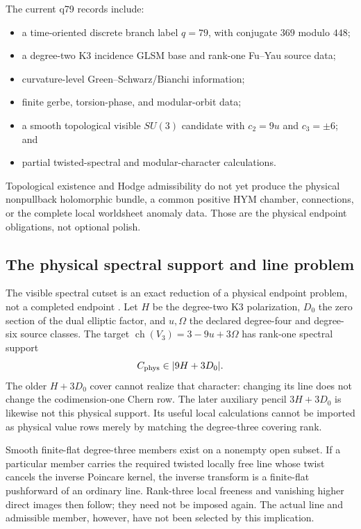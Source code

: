 \documentclass[11pt]{article}
\begin{document}
The current q79 records include:
\begin{itemize}
\item a time-oriented discrete branch label \(q=79\), with conjugate
\(369\) modulo \(448\);
\item a degree-two K3 incidence GLSM base and rank-one Fu--Yau source data;
\item curvature-level Green--Schwarz/Bianchi information;
\item finite gerbe, torsion-phase, and modular-orbit data;
\item a smooth topological visible \(SU(3)\) candidate with
\(c_2=9u\) and \(c_3=\pm6\); and
\item partial twisted-spectral and modular-character calculations.
\end{itemize}

Topological existence and Hodge admissibility do not yet produce the
physical nonpullback holomorphic bundle, a common positive HYM chamber,
connections, or the complete local worldsheet anomaly data. Those are the
physical endpoint obligations, not optional polish.

\subsection{The physical spectral support and line problem}
\label{sec:physical-spectral}

The visible spectral cutset is an exact reduction of a physical endpoint
problem, not a completed endpoint \cite{FrozenVisible}. Let $H$ be the
degree-two K3 polarization, $D_0$ the zero section of the dual elliptic
factor, and $u,\Omega$ the declared degree-four and degree-six source
classes. The target $\operatorname{ch}(V_3)=3-9u+3\Omega$ has rank-one
spectral support
\[
 C_{\rm phys}\in|9H+3D_0|.
\]
The older $H+3D_0$ cover cannot realize that character: changing its line
does not change the codimension-one Chern row. The later auxiliary pencil
$3H+3D_0$ is likewise not this physical support. Its useful local
calculations cannot be imported as physical value rows merely by matching
the degree-three covering rank.

Smooth finite-flat degree-three members exist on a nonempty open subset.
If a particular member carries the required twisted locally free line whose
twist cancels the inverse Poincare kernel, the inverse transform is a
finite-flat pushforward of an ordinary line. Rank-three local freeness and
vanishing higher direct images then follow; they need not be imposed again.
The actual line and admissible member, however, have not been selected by
this implication.
\end{document}

